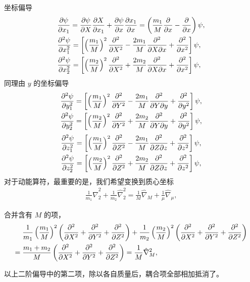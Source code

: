 坐标偏导
\begin{align}
    &\pdv{\psi}{x_1} = \pdv{\psi}{X} \pdv{X}{x_1} + \pdv{\psi}{x}\pdv{x_1}{x} =
    \left(\frac{m_1}{M} \pdv{x} - \pdv{x}\right)\psi, \\
    &\pdv[2]{\psi}{x_1} = 
    \left[
        \left(\frac {m_1}M\right)^2 \pdv[2]{X} - \frac{2m_1}{M} \pdv[2]{}{X}{x} + \pdv[2]{x}
    \right]\psi,
    \\
    &\pdv[2]{\psi}{x_2} = 
    \left[
        \left(\frac {m_2}M\right)^2 \pdv[2]{X} + \frac{2m_2}{M} \pdv[2]{}{X}{x} + \pdv[2]{x}
    \right]\psi,
\end{align}
同理由 $y$ 的坐标偏导
\begin{align}
    &\pdv[2]{\psi}{y_1} = 
    \left[
        \left(\frac {m_1}M\right)^2 \pdv[2]{Y} - \frac{2m_1}{M} \pdv[2]{}{Y}{y} + \pdv[2]{y}
    \right]\psi,
    \\
    &\pdv[2]{\psi}{y_2} = 
    \left[
        \left(\frac {m_2}M\right)^2 \pdv[2]{Y} + \frac{2m_2}{M} \pdv[2]{}{Y}{y} + \pdv[2]{y}
    \right]\psi,
\end{align}
\begin{align}
    &\pdv[2]{\psi}{z_1} = 
    \left[
        \left(\frac {m_1}M\right)^2 \pdv[2]{Z} - \frac{2m_1}{M} \pdv[2]{}{Z}{z} + \pdv[2]{z}
    \right]\psi,
    \\
    &\pdv[2]{\psi}{z_2} = 
    \left[
        \left(\frac {m_2}M\right)^2 \pdv[2]{Z} + \frac{2m_2}{M} \pdv[2]{}{Z}{z} + \pdv[2]{z}
    \right]\psi,
\end{align}
对于动能算符，最重要的是，我们希望变换到质心坐标
\begin{align}
    \frac1{m_1} \hat \nabla_2^2 + \frac1{m_2} \hat \nabla_2^2  = \frac1M \hat \nabla _M + \frac1{\mu} \hat \nabla _\mu,
\end{align}

合并含有 $M$ 的项，
\begin{align}
    &\frac 1{m_1} 
    \left(\frac{m_1}M\right)^2
    \left(
        \pdv[2]{X} + \pdv[2]{Y} + \pdv[2]{Z}
    \right) 
    + \frac1{m_2} 
    \left(\frac{m_2}M\right)^2 
    \left(
        \pdv[2]{X} + \pdv[2]{Y} + \pdv[2]{Z}
    \right) \notag \\
     = {}&\frac{m_1 + m_2}{M} \left(
        \pdv[2]{X} + \pdv[2]{Y} + \pdv[2]{Z}
     \right) = \frac1M \hat \nabla_M^2,
\end{align}

以上二阶偏导中的第二项，除以各自质量后，耦合项全部相加抵消了。

